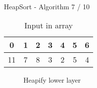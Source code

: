 \begin{frame}{HeapSort - Algorithm 7 / 10}
  \vspace{-1.0em}
  \begin{table}[!h]%
    \caption{Input in array}%
    \label{tab:heapify_numbers}%
    \begin{minipage}{12.41em}
      \begin{tabularx}{\textwidth}{ccccccc}
        {\color{Mittel-Gruen}0}&
        {\color{Mittel-Gruen}1}&
        {\color{Mittel-Gruen}2}&
        {\color{Mittel-Gruen}3}&
        {\color{Mittel-Gruen}4}&
        {\color{Mittel-Gruen}5}&
        {\color{Mittel-Gruen}6}\\
        \hline
        \multicolumn{1}{|c}{11}&%
        \multicolumn{1}{|c}{7}&%
        \multicolumn{1}{|c}{8}&%
        \multicolumn{1}{|c}{3}&%
        \multicolumn{1}{|c}{2}&%
        \multicolumn{1}{|c}{5}&%
        \multicolumn{1}{|c|}{4}\\
        \hline
      \end{tabularx}
    \end{minipage}
  \end{table}
  \vspace*{-0.5em}
  \begin{center}
    \begin{figure}[!h]%
      \begin{columns}%
        \begin{column}{0.425\textwidth}%
          \begin{minipage}{\textwidth}%
            \begin{center}%
            \end{center}%
          \end{minipage}%
        \end{column}%
        \begin{column}{0.425\textwidth}%
          \begin{minipage}{\textwidth}%
            \begin{center}%
            \end{center}%
          \end{minipage}%
        \end{column}%
      \end{columns}%
      \caption{Heapify lower layer}%
      \label{fig:heapify_lower}%
    \end{figure}
  \end{center}
\end{frame}

